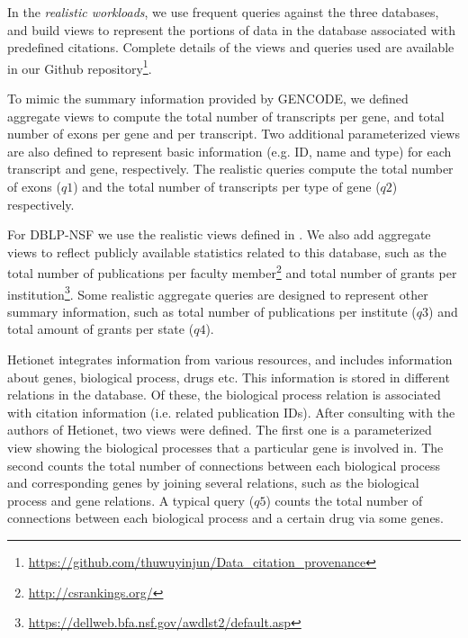 
In the {\em realistic workloads}, we use frequent queries against the three databases, and build views to represent the portions of data in the database associated with predefined citations. Complete details of  the views and queries used are available in our Github repository\footnote{\url{https://github.com/thuwuyinjun/Data_citation_provenance}}. 

To mimic the summary information provided by GENCODE, we defined aggregate views to compute the total number of transcripts per gene, and total number of exons per gene and per transcript. Two additional parameterized views are also defined to represent basic information (e.g. ID, name and type) for each transcript and gene, respectively. The realistic queries  compute the total number of exons ($q1$) and the total number of transcripts per type of gene ($q2$) respectively.

For DBLP-NSF we use the realistic views defined in \cite{wu2018data}. We also add aggregate views to reflect publicly available statistics related to this database, such as the total number of publications per faculty member\footnote{\url{http://csrankings.org/}} and total number of grants per institution\footnote{\url{https://dellweb.bfa.nsf.gov/awdlst2/default.asp}}. Some realistic aggregate queries are designed to represent other summary information, such as total number of publications per institute ($q3$) and total amount of grants per state ($q4$).

Hetionet integrates information from various resources, and includes information about genes, biological process, drugs etc.  This information is stored in different relations in the database. Of these, the biological process relation is associated with citation information (i.e. related publication IDs). After consulting with the authors of Hetionet, two views were defined. The first one is a parameterized view showing the  biological processes that a particular gene is involved in. The second counts the total number of connections between each biological process and corresponding genes by joining several relations, such as the biological process and gene relations.  A typical query ($q5$) counts the total number of connections between each biological process and a certain drug via some genes.


